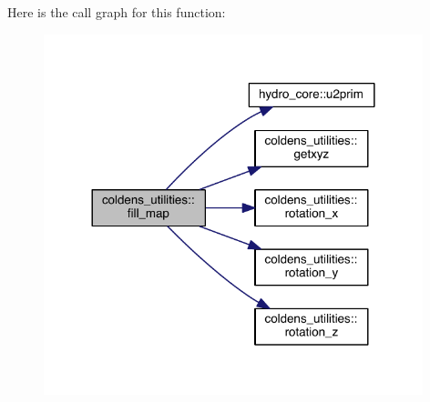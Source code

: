 Here is the call graph for this function\+:\nopagebreak
\begin{figure}[H]
\begin{center}
\leavevmode
\includegraphics[width=312pt]{namespacecoldens__utilities_af035b829538114f8b62f54365269bdab_cgraph}
\end{center}
\end{figure}


\hypertarget{namespacecoldens__utilities_a7df7ce1cf8187ca5393dc35effa22020}{}
